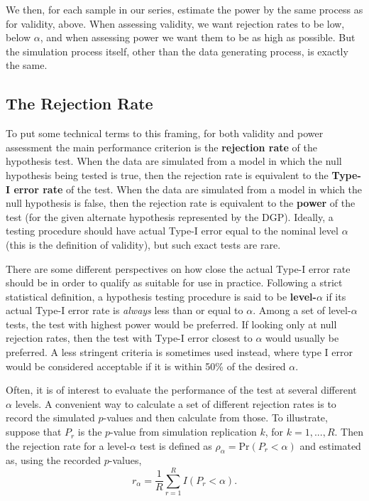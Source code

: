 \documentclass[
]{book}
\begin{document}
We then, for each sample in our series, estimate the power by the same process as for validity, above.
When assessing validity, we want rejection rates to be low, below \(\alpha\), and when assessing power we want them to be as high as possible. But the simulation process itself, other than the data generating process, is exactly the same.

\subsection{The Rejection Rate}\label{the-rejection-rate}

To put some technical terms to this framing, for both validity and power assessment the main performance criterion is the \textbf{rejection rate} of the hypothesis test. When the data are simulated from a model in which the null hypothesis being tested is true, then the rejection rate is equivalent to the \textbf{Type-I error rate} of the test. When the data are simulated from a model in which the null hypothesis is false, then the rejection rate is equivalent to the \textbf{power} of the test (for the given alternate hypothesis represented by the DGP).
Ideally, a testing procedure should have actual Type-I error equal to the nominal level \(\alpha\) (this is the definition of validity), but such exact tests are rare.

There are some different perspectives on how close the actual Type-I error rate should be in order to qualify as suitable for use in practice. Following a strict statistical definition, a hypothesis testing procedure is said to be \textbf{level-\(\alpha\)} if its actual Type-I error rate is \emph{always} less than or equal to \(\alpha\).
Among a set of level-\(\alpha\) tests, the test with highest power would be preferred.
If looking only at null rejection rates, then the test with Type-I error closest to \(\alpha\) would usually be preferred.
A less stringent criteria is sometimes used instead, where type I error would be considered acceptable if it is within 50\% of the desired \(\alpha\).

Often, it is of interest to evaluate the performance of the test at several different \(\alpha\) levels.
A convenient way to calculate a set of different rejection rates is to record the simulated \(p\)-values and then calculate from those.
To illustrate, suppose that \(P_r\) is the \(p\)-value from simulation replication \(k\), for \(k = 1,...,R\).
Then the rejection rate for a level-\(\alpha\) test is defined as \(\rho_\alpha = \text{Pr}\left(P_r < \alpha\right)\) and estimated as, using the recorded \(p\)-values,
\[r_\alpha = \frac{1}{R} \sum_{r=1}^R I(P_r < \alpha).\]
\end{document}
